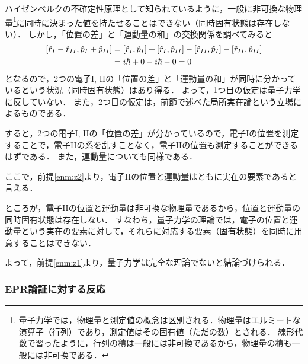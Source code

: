 \documentclass[uplatex,dvipdfmx]{vkaishi}
\begin{document}
ハイゼンベルクの不確定性原理として知られているように，一般に非可換な物理量\footnote{
  量子力学では，物理量と測定値の概念は区別される．物理量はエルミートな演算子（行列）であり，測定値はその固有値（ただの数）とされる．
  線形代数で習ったように，行列の積は一般には非可換であるから，物理量の積も一般には非可換である．
}に同時に決まった値を持たせることはできない（同時固有状態は存在しない）．
しかし，「位置の差」と「運動量の和」の交換関係を調べてみると
\begin{align*}
  \comm{\hat r_I - \hat r_{II}}{\hat p_I + \hat p_{II}}
  &= \comm{\hat r_I}{\hat p_I} + \comm{\hat r_I}{\hat p_{II}} - \comm{\hat r_{II}}{\hat p_I} - \comm{\hat r_{II}}{\hat p_{II}} \\
  &= i\hbar + 0 - i\hbar - 0
  = 0
\end{align*}
となるので，2つの電子I, IIの「位置の差」と「運動量の和」が同時に分かっているという状況（同時固有状態）はあり得る．
よって，1つ目の仮定は量子力学に反していない．
また，2つ目の仮定は，前節で述べた局所実在論という立場によるものである．\par
すると，2つの電子I, IIの「位置の差」が分かっているので，電子Iの位置を測定することで，電子IIの系を乱すことなく，電子IIの位置も測定することができるはずである．
また，運動量についても同様である．\par
ここで，前提\ref{enm:z2}より，電子IIの位置と運動量はともに実在の要素であると言える．\par
ところが，電子IIの位置と運動量は非可換な物理量であるから，位置と運動量の同時固有状態は存在しない．
すなわち，量子力学の理論では，電子の位置と運動量という実在の要素に対して，それらに対応する要素（固有状態）を同時に用意することはできない．\par
よって，前提\ref{enm:z1}より，量子力学は完全な理論でないと結論づけられる．

%
\subsubsection{EPR論証に対する反応} %
\end{document}
